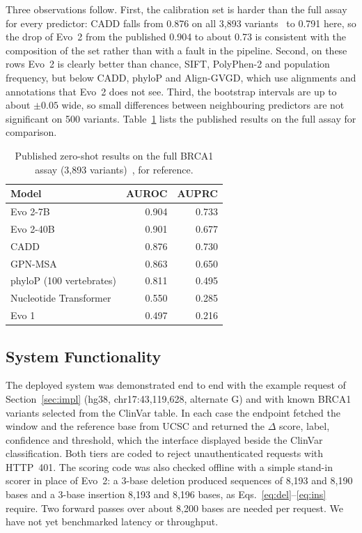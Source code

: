 \documentclass[conference,a4paper]{IEEEtran}
\begin{document}
Three observations follow. First, the calibration set is harder than the full assay for every predictor: CADD falls from 0.876 on all 3{,}893 variants~\cite{brixi2026evo2} to 0.791 here, so the drop of Evo~2 from the published 0.904 to about 0.73 is consistent with the composition of the set rather than with a fault in the pipeline. Second, on these rows Evo~2 is clearly better than chance, SIFT, PolyPhen-2 and population frequency, but below CADD, phyloP and Align-GVGD, which use alignments and annotations that Evo~2 does not see. Third, the bootstrap intervals are up to about $\pm0.05$ wide, so small differences between neighbouring predictors are not significant on 500 variants. Table~\ref{tab:evo2} lists the published results on the full assay for comparison.

\begin{table}[!t]
\caption{Published zero-shot results on the full BRCA1 assay (3{,}893 variants)~\cite{brixi2026evo2}, for reference.}
\label{tab:evo2}
\centering
\footnotesize
\begin{tabular}{@{}lrr@{}}
\toprule
Model & AUROC & AUPRC \\
\midrule
Evo 2-7B & 0.904 & 0.733 \\
Evo 2-40B & 0.901 & 0.677 \\
CADD & 0.876 & 0.730 \\
GPN-MSA & 0.863 & 0.650 \\
phyloP (100 vertebrates) & 0.811 & 0.495 \\
Nucleotide Transformer & 0.550 & 0.285 \\
Evo 1 & 0.497 & 0.216 \\
\bottomrule
\end{tabular}
\end{table}

\subsection{System Functionality}
The deployed system was demonstrated end to end with the example request of Section~\ref{sec:impl} (hg38, chr17:43{,}119{,}628, alternate G) and with known BRCA1 variants selected from the ClinVar table. In each case the endpoint fetched the window and the reference base from UCSC and returned the $\Delta$ score, label, confidence and threshold, which the interface displayed beside the ClinVar classification. Both tiers are coded to reject unauthenticated requests with HTTP~401. The scoring code was also checked offline with a simple stand-in scorer in place of Evo~2: a 3-base deletion produced sequences of 8{,}193 and 8{,}190 bases and a 3-base insertion 8{,}193 and 8{,}196 bases, as Eqs.~\eqref{eq:del}--\eqref{eq:ins} require. Two forward passes over about 8{,}200 bases are needed per request. We have not yet benchmarked latency or throughput.
\end{document}
